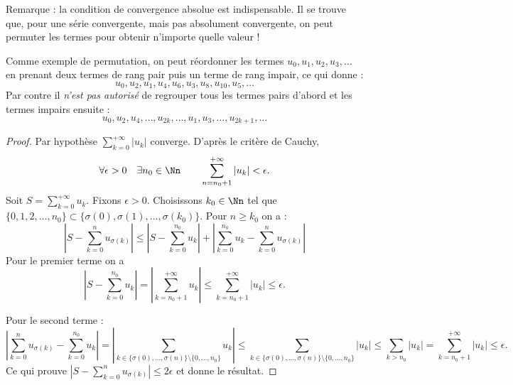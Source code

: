 \documentclass[class=report,crop=false]{standalone}
\begin{document}
Remarque : la condition de convergence absolue est indispensable.
Il se trouve que, pour une série convergente, mais pas absolument convergente, 
on peut permuter les termes pour obtenir n'importe quelle valeur !

Comme exemple de permutation, on peut réordonner les termes $u_0,u_1,u_2,u_3,\ldots$ 
en prenant deux termes de rang pair puis un terme de rang impair, ce qui donne :
$$u_0, u_2, u_1, u_4, u_6, u_3, u_8, u_{10}, u_5,\ldots$$
Par contre il \emph{n'est pas autorisé} de regrouper tous les termes pairs d'abord et 
les termes impairs ensuite :
$$u_0,u_2, u_4,\ldots, u_{2k},\ldots,u_1,u_3,\ldots, u_{2k+1},\ldots$$


\begin{proof}
Par hypothèse $\sum_{k=0}^{+\infty} |u_k|$ converge. 
D'après le critère de Cauchy,
$$\forall \epsilon>0\quad \exists n_0\in\Nn \qquad \sum_{n=n_0+1}^{+\infty} |u_k|<\epsilon.$$
Soit $S=\sum_{k=0}^{+\infty} u_k$. Fixons $\epsilon>0$. 
Choisissons $k_0\in\Nn$ tel que 
$\big\{0, 1,2,\dots,n_0\big\} \subset \big\{\sigma(0),\sigma(1),\ldots, \sigma(k_0)\big\}$.  
Pour $n\geq k_0$ on a :
$$\left|S-\sum_{k=0}^n u_{\sigma(k)}\right| \le
\left|S-\sum_{k=0}^{n_0} u_k\right|+\left|\sum_{k=0}^{n_0} u_k- 
\sum_{k=0}^n u_{\sigma(k)}\right|$$
Pour le premier terme on a 
$$\left|S-\sum_{k=0}^{n_0} u_k\right| = \left| \sum_{k=n_0+1}^{+\infty} u_k\right| 
\le \sum_{k=n_0+1}^{+\infty} |u_k|
\le \epsilon.$$

Pour le second terme :
$$\left|\sum_{k=0}^n u_{\sigma(k)}-\sum_{k=0}^{n_0} u_k\right|
= \left|\sum_{k \in \{\sigma(0),\ldots,\sigma(n)\}\setminus\{0,\ldots,n_0\}} u_k \right|
\le \sum_{k \in \{\sigma(0),\ldots,\sigma(n)\}\setminus\{0,\ldots,n_0\}} |u_k| 
\le \sum_{k > n_0} |u_k| 
= \sum_{k=n_0+1}^{+\infty} |u_k|
\le \epsilon.$$
Ce qui prouve $\left|S-\sum_{k=0}^n u_{\sigma(k)}\right| \le 2\epsilon$ et donne le résultat.
\end{proof}



\end{document}
